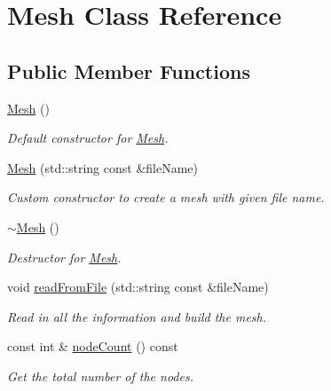 \hypertarget{class_mesh}{}\section{Mesh Class Reference}
\label{class_mesh}
\subsection*{Public Member Functions}
\begin{DoxyCompactItemize}
\item 
\mbox{\label{class_mesh_a2af137f1571af89172b9c102302c416b}} 
\mbox{\hyperlink{class_mesh_a2af137f1571af89172b9c102302c416b}{Mesh}} ()
\begin{DoxyCompactList}\small\item\em Default constructor for \mbox{\hyperlink{class_mesh}{Mesh}}. \end{DoxyCompactList}\item 
\mbox{\hyperlink{class_mesh_af9ff79e2003cfde74b16266cd8113acf}{Mesh}} (std\+::string const \&file\+Name)
\begin{DoxyCompactList}\small\item\em Custom constructor to create a mesh with given file name. \end{DoxyCompactList}\item 
\mbox{\label{class_mesh_a5efe4da1a4c0971cfb037bd70304c303}} 
\mbox{\hyperlink{class_mesh_a5efe4da1a4c0971cfb037bd70304c303}{$\sim$\+Mesh}} ()
\begin{DoxyCompactList}\small\item\em Destructor for \mbox{\hyperlink{class_mesh}{Mesh}}. \end{DoxyCompactList}\item 
void \mbox{\hyperlink{class_mesh_a519813e103dbb3fb1739a2c40b3e1153}{read\+From\+File}} (std\+::string const \&file\+Name)
\begin{DoxyCompactList}\small\item\em Read in all the information and build the mesh. \end{DoxyCompactList}\item 
const int \& \mbox{\hyperlink{class_mesh_a6a535f67f00ed39f945aaa1e8039a277}{node\+Count}} () const
\begin{DoxyCompactList}\small\item\em Get the total number of the nodes. \end{DoxyCompactList}\item 

\end{DoxyCompactItemize}
